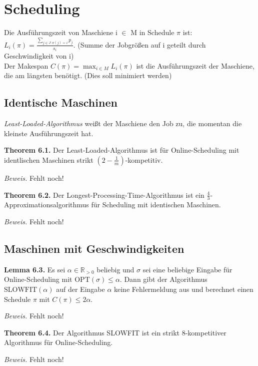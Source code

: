 \chapter{Scheduling}

Die Ausführungszeit von Maschiene i $\in$ M in Schedule $\pi$ ist: $L_{i}(\pi) = \tfrac{\sum_{j \in J: \pi(j)=i} p_{j}}{s_{i}}$. (Summe der Jobgrößen auf i geteilt durch Geschwindigkeit von i) \\
Der Makespan $C(\pi) = \max_{i \in M} L_{i}(\pi)$ ist die Ausführungszeit der Maschiene, die am längsten benötigt. (Dies soll minimiert werden)

\section{Identische Maschinen}

\textit{Least-Loaded-Algorithmus} weißt der Maschiene den Job zu, die momentan die kleinste Ausführungszeit hat.

\textbf{Theorem 6.1.} Der Least-Loaded-Algorithmus ist für Online-Scheduling mit identlischen Maschinen strikt $(2-\frac{1}{m})$-kompetitiv.

\textit{Beweis.} Fehlt noch!


\textbf{Theorem 6.2.} Der Longest-Processing-Time-Algorithmus ist ein $\frac{4}{3}$-Approximationsalgorithmus für Scheduling mit identischen Maschinen.

\textit{Beweis.} Fehlt noch!



\section{Maschinen mit Geschwindigkeiten}

\textbf{Lemma 6.3.} Es sei $\alpha \in \mathbb{R}_{>0}$ beliebig und $\sigma$ sei eine beliebige Eingabe für Online-Scheduling mit $\textrm{OPT}(\sigma) \leq \alpha$. Dann gibt der Algorithmus $\textrm{SLOWFIT}(\alpha)$ auf der Eingabe $\alpha$ keine Fehlermeldung aus und berechnet einen Schedule $\pi$ mit $C(\pi) \leq 2 \alpha$.

\textit{Beweis.} Fehlt noch!


\textbf{Theorem 6.4.} Der Algorithmus SLOWFIT ist ein strikt 8-kompetitiver Algorithmus für Online-Scheduling.

\textit{Beweis.} Fehlt noch!
